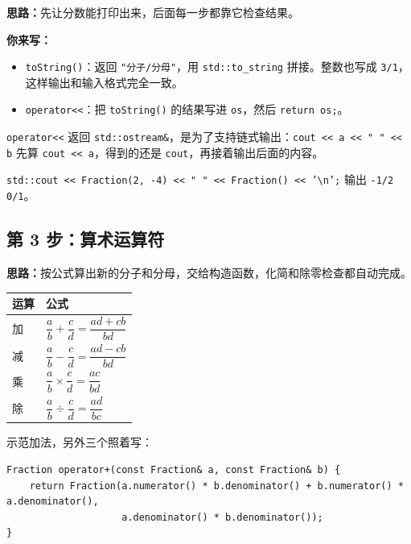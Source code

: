 \documentclass[11pt,a4paper]{article}
\newcommand{\code}[1]{\texttt{#1}}
\newcommand{\idea}{\textbf{思路：}}
\newcommand{\todo}{\textbf{你来写：}}
\begin{document}
\idea 先让分数能打印出来，后面每一步都靠它检查结果。

\todo
\begin{itemize}
  \item \code{toString()}：返回 \code{"分子/分母"}，用 \code{std::to\_string} 拼接。整数也写成 \code{3/1}，这样输出和输入格式完全一致。
  \item \code{operator<<}：把 \code{toString()} 的结果写进 \code{os}，然后 \code{return os;}。
\end{itemize}

\begin{tip}
\code{operator<<} 返回 \code{std::ostream\&}，是为了支持链式输出：\code{cout << a << " " << b} 先算 \code{cout << a}，得到的还是 \code{cout}，再接着输出后面的内容。
\end{tip}

\begin{done}
\code{std::cout << Fraction(2, -4) << " " << Fraction() << '\textbackslash n';} 输出 \code{-1/2 0/1}。
\end{done}

\subsection{第 3 步：算术运算符}

\idea 按公式算出新的分子和分母，交给构造函数，化简和除零检查都自动完成。

\begin{center}
\small
\begin{tabular}{@{}ll@{}}
\toprule
运算 & 公式 \\
\midrule
加 & $\dfrac{a}{b} + \dfrac{c}{d} = \dfrac{ad + cb}{bd}$ \\[1.2ex]
减 & $\dfrac{a}{b} - \dfrac{c}{d} = \dfrac{ad - cb}{bd}$ \\[1.2ex]
乘 & $\dfrac{a}{b} \times \dfrac{c}{d} = \dfrac{ac}{bd}$ \\[1.2ex]
除 & $\dfrac{a}{b} \div \dfrac{c}{d} = \dfrac{ad}{bc}$ \\
\bottomrule
\end{tabular}
\end{center}

示范加法，另外三个照着写：

\begin{lstlisting}
Fraction operator+(const Fraction& a, const Fraction& b) {
    return Fraction(a.numerator() * b.denominator() + b.numerator() * a.denominator(),
                    a.denominator() * b.denominator());
}
\end{lstlisting}
\end{document}

